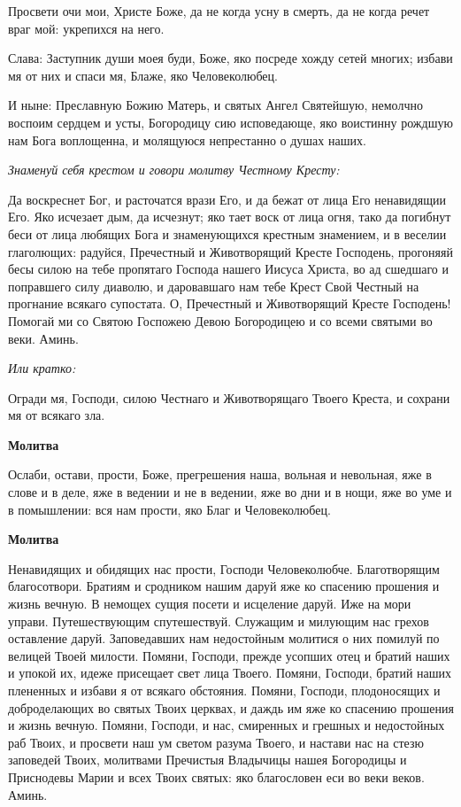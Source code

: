 Просвети очи мои, Христе Боже, да не когда усну в смерть, да не когда речет враг мой: укрепихся на него.


Слава: Заступник души моея буди, Боже, яко посреде хожду сетей многих; избави мя от них и спаси мя, Блаже, яко Человеколюбец. 


И ныне: Преславную Божию Матерь, и святых Ангел Святейшую, немолчно воспоим сердцем и усты, Богородицу сию исповедающе, яко воистинну рождшую нам Бога воплощенна, и молящуюся непрестанно о душах наших.


\medskip
\itshape Знаменуй себя крестом и говори молитву Честному Кресту:\normalfont{}


Да воскреснет Бог, и расточатся врази Его, и да бежат от лица Его ненавидящии Его. Яко исчезает дым, да исчезнут; яко тает воск от лица огня, тако да погибнут беси от лица любящих Бога и знаменующихся крестным знамением, и в веселии глаголющих: радуйся, Пречестный и Животворящий Кресте Господень, прогоняяй бесы силою на тебе пропятаго Господа нашего Иисуса Христа, во ад сшедшаго и поправшего силу диаволю, и даровавшаго нам тебе Крест Свой Честный на прогнание всякаго супостата. О, Пречестный и Животворящий Кресте Господень! Помогай ми со Святою Госпожею Девою Богородицею и со всеми святыми во веки. Аминь.


\medskip
\itshape Или кратко:\normalfont{}


Огради мя, Господи, силою Честнаго и Животворящаго Твоего Креста, и сохрани мя от всякаго зла.


\medskip
\bfseries Молитва\normalfont{}


Ослаби, остави, прости, Боже, прегрешения наша, вольная и невольная, яже в слове и в деле, яже в ведении и не в ведении, яже во дни и в нощи, яже во уме и в помышлении: вся нам прости, яко Благ и Человеколюбец.


\medskip
\bfseries Молитва\normalfont{}


Ненавидящих и обидящих нас прости, Господи Человеколюбче. Благотворящим благосотвори. Братиям и сродником нашим даруй яже ко спасению прошения и жизнь вечную. В немощех сущия посети и исцеление даруй. Иже на мори управи. Путешествующим спутешествуй. Служащим и милующим нас грехов оставление даруй. Заповедавших нам недостойным молитися о них помилуй по велицей Твоей милости. Помяни, Господи, прежде усопших отец и братий наших и упокой их, идеже присещает свет лица Твоего. Помяни, Господи, братий наших плененных и избави я от всякаго обстояния. Помяни, Господи, плодоносящих и доброделающих во святых Твоих церквах, и даждь им яже ко спасению прошения и жизнь вечную. Помяни, Господи, и нас, смиренных и грешных и недостойных раб Твоих, и просвети наш ум светом разума Твоего, и настави нас на стезю заповедей Твоих, молитвами Пречистыя Владычицы нашея Богородицы и Приснодевы Марии и всех Твоих святых: яко благословен еси во веки веков. Аминь.


